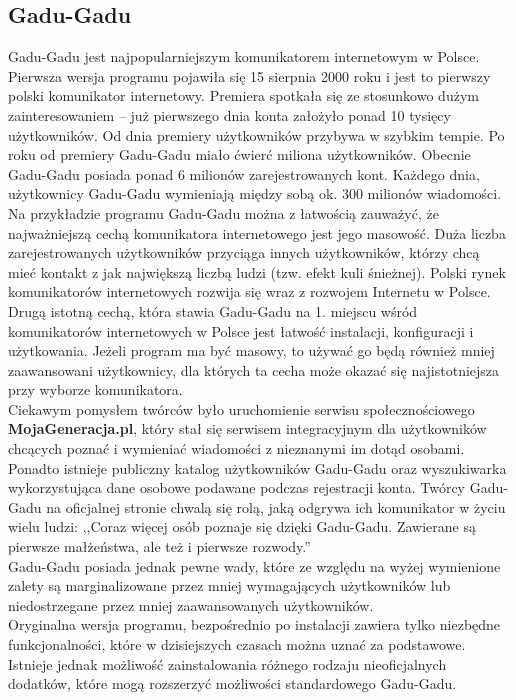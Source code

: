 \documentclass[a4paper,12pt]{article}
\begin{document}
\subsection[Gadu-Gadu]{Gadu-Gadu}
Gadu-Gadu jest najpopularniejszym komunikatorem internetowym w Polsce. Pierwsza wersja programu pojawiła się 15 sierpnia 2000 roku i jest to pierwszy polski komunikator internetowy. Premiera spotkała się ze stosunkowo dużym zainteresowaniem -- już pierwszego dnia konta założyło ponad 10 tysięcy użytkowników. Od dnia premiery użytkowników przybywa w szybkim tempie. Po roku od premiery Gadu-Gadu miało ćwierć miliona użytkowników.
Obecnie Gadu-Gadu posiada ponad 6 milionów zarejestrowanych kont. Każdego dnia, użytkownicy Gadu-Gadu wymieniają między sobą ok. 300 milionów wiadomości.\\
Na przykładzie programu Gadu-Gadu można z łatwością zauważyć, że najważniejszą cechą komunikatora internetowego jest jego masowość. Duża liczba zarejestrowanych użytkowników przyciąga innych użytkowników, którzy chcą mieć kontakt z jak największą liczbą ludzi (tzw. efekt kuli śnieżnej). Polski rynek komunikatorów internetowych rozwija się wraz z rozwojem Internetu w Polsce.\\
Drugą istotną cechą, która stawia Gadu-Gadu na 1. miejscu wśród komunikatorów internetowych w Polsce jest łatwość instalacji, konfiguracji i użytkowania. Jeżeli program ma być masowy, to używać go będą również mniej zaawansowani użytkownicy, dla których ta cecha może okazać się najistotniejsza przy wyborze komunikatora.\\
Ciekawym pomysłem twórców było uruchomienie serwisu społecznościowego \textbf{MojaGeneracja.pl}, który stał się serwisem integracyjnym dla użytkowników chcących poznać i wymieniać wiadomości z nieznanymi im dotąd osobami. Ponadto istnieje publiczny katalog użytkowników Gadu-Gadu oraz wyszukiwarka wykorzystująca dane osobowe podawane podczas rejestracji konta. Twórcy Gadu-Gadu na oficjalnej stronie chwalą się rolą, jaką odgrywa ich komunikator w życiu wielu ludzi:
,,Coraz więcej osób poznaje się dzięki Gadu-Gadu. Zawierane są pierwsze małżeństwa, ale też i pierwsze rozwody.''\cite{GG}\\
Gadu-Gadu posiada jednak pewne wady, które ze względu na wyżej wymienione zalety są marginalizowane przez mniej wymagających użytkowników lub niedostrzegane przez mniej zaawansowanych użytkowników.\\
Oryginalna wersja programu, bezpośrednio po instalacji zawiera tylko niezbędne funkcjonalności, które w dzisiejszych czasach można uznać za podstawowe. Istnieje jednak możliwość zainstalowania różnego rodzaju nieoficjalnych dodatków, które mogą rozszerzyć możliwości standardowego Gadu-Gadu.\\
\end{document}
